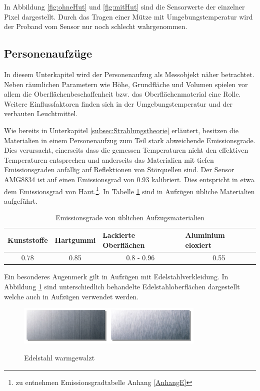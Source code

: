 In Abbildung \ref{fig:ohneHut} und \ref{fig:mitHut} sind die Sensorwerte der einzelner Pixel dargestellt. Durch das Tragen einer Mütze mit Umgebungstemperatur wird der Proband vom Sensor nur noch schlecht wahrgenommen.

\subsection{Personenaufzüge}
\label{subsec:Personenaufzuege}
In diesem Unterkapitel wird der Personenaufzug als Messobjekt näher betrachtet. Neben räumlichen Parametern wie Höhe, Grundfläche und Volumen spielen vor allem die Oberflächenbeschaffenheit bzw. das Oberflächenmaterial eine Rolle. Weitere Einflussfaktoren finden sich in der Umgebungstemperatur und der verbauten Leuchtmittel.

Wie bereits in Unterkapitel \ref{subsec:Strahlungstheorie} erläutert, besitzen die Materialien in einem Personenaufzug zum Teil stark abweichende Emissionsgrade. Dies verursacht, einerseits dass die gemessen Temperaturen nicht den effektiven Temperaturen entsprechen und anderseits das Materialien mit tiefen Emissionsgraden anfällig auf Reflektionen von Störquellen sind. Der Sensor AMG8834 ist auf einen Emissionsgrad von 0.93 kalibriert. Dies entspricht in etwa dem Emissionsgrad von Haut.\footnote[9]{ zu entnehmen Emissionsgradtabelle Anhang \ref{AnhangE}}. In Tabelle \ref{tab:Emission} sind in Aufzügen übliche Materialien aufgeführt.
	
\begin{table}[H]
	\centering
	\caption{Emissionsgrade von üblichen Aufzugsmaterialien}
	\label{tab:Emission}
	\begin{tabular}{|l|l|l|l|}
		\hline
		\rowcolor[HTML]{C0C0C0} 
		Kunststoffe                & Hartgummi                 & Lackierte Oberflächen           & Aluminium eloxiert        \\ \hline
		\multicolumn{1}{|c|}{0.78} & \multicolumn{1}{c|}{0.85} & \multicolumn{1}{c|}{0.8 - 0.96} & \multicolumn{1}{c|}{0.55} \\ \hline
	\end{tabular}
\end{table}
	

Ein besonderes Augenmerk gilt in Aufzügen mit Edelstahlverkleidung. In Abbildung \ref{fig:Edelstahl} sind unterschiedlich behandelte Edelstahloberflächen dargestellt welche auch in Aufzügen verwendet werden.  
\begin{figure}[H]
	\centering
	\includegraphics[width=0.8\textwidth]
	{fig/Edelstahl_matt.PNG}
	\caption[Edelstahl warmgewalzt]{Edelstahl warmgewalzt} \protect\cite{Edelstahl}
	\label{fig:Edelstahl}
\end{figure}

